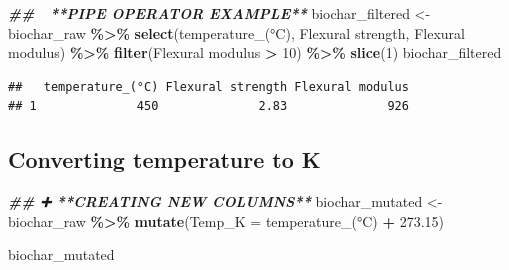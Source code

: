 \documentclass[
]{article}
\newenvironment{Shaded}{\begin{snugshade}}{\end{snugshade}}
\newcommand{\AttributeTok}[1]{\textcolor[rgb]{0.13,0.29,0.53}{#1}}
\newcommand{\DecValTok}[1]{\textcolor[rgb]{0.00,0.00,0.81}{#1}}
\newcommand{\DocumentationTok}[1]{\textcolor[rgb]{0.56,0.35,0.01}{\textbf{\textit{#1}}}}
\newcommand{\FloatTok}[1]{\textcolor[rgb]{0.00,0.00,0.81}{#1}}
\newcommand{\FunctionTok}[1]{\textcolor[rgb]{0.13,0.29,0.53}{\textbf{#1}}}
\newcommand{\NormalTok}[1]{#1}
\newcommand{\OtherTok}[1]{\textcolor[rgb]{0.56,0.35,0.01}{#1}}
\newcommand{\SpecialCharTok}[1]{\textcolor[rgb]{0.81,0.36,0.00}{\textbf{#1}}}
\newcommand{\StringTok}[1]{\textcolor[rgb]{0.31,0.60,0.02}{#1}}
\begin{document}
\begin{Shaded}
\begin{Highlighting}[]
\DocumentationTok{\#\# 🧵 **PIPE OPERATOR EXAMPLE**}
\NormalTok{biochar\_filtered }\OtherTok{\textless{}{-}}\NormalTok{ biochar\_raw }\SpecialCharTok{\%\textgreater{}\%} 
  \FunctionTok{select}\NormalTok{(}\StringTok{\textasciigrave{}}\AttributeTok{temperature\_(°C)}\StringTok{\textasciigrave{}}\NormalTok{, }\StringTok{\textasciigrave{}}\AttributeTok{Flexural strength}\StringTok{\textasciigrave{}}\NormalTok{, }\StringTok{\textasciigrave{}}\AttributeTok{Flexural modulus}\StringTok{\textasciigrave{}}\NormalTok{) }\SpecialCharTok{\%\textgreater{}\%} 
  \FunctionTok{filter}\NormalTok{(}\StringTok{\textasciigrave{}}\AttributeTok{Flexural modulus}\StringTok{\textasciigrave{}} \SpecialCharTok{\textgreater{}} \DecValTok{10}\NormalTok{) }\SpecialCharTok{\%\textgreater{}\%} 
  \FunctionTok{slice}\NormalTok{(}\DecValTok{1}\NormalTok{)}
\NormalTok{biochar\_filtered}
\end{Highlighting}
\end{Shaded}

\begin{verbatim}
##   temperature_(°C) Flexural strength Flexural modulus
## 1              450              2.83              926
\end{verbatim}

\subsection{Converting temperature to
K}\label{converting-temperature-to-k}

\begin{Shaded}
\begin{Highlighting}[]
\DocumentationTok{\#\# ➕ **CREATING NEW COLUMNS**}
\NormalTok{biochar\_mutated }\OtherTok{\textless{}{-}}\NormalTok{ biochar\_raw }\SpecialCharTok{\%\textgreater{}\%} 
  \FunctionTok{mutate}\NormalTok{(}\AttributeTok{Temp\_K =} \StringTok{\textasciigrave{}}\AttributeTok{temperature\_(°C)}\StringTok{\textasciigrave{}} \SpecialCharTok{+} \FloatTok{273.15}\NormalTok{)}

\NormalTok{biochar\_mutated}
\end{Highlighting}
\end{Shaded}
\end{document}

